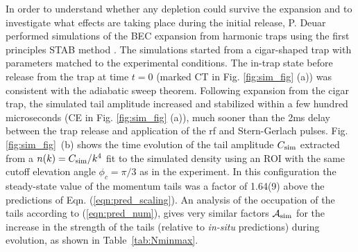 	In order to {understand} whether any depletion could survive the expansion and to investigate what effects are taking place during the initial release, P. Deuar performed simulations of the BEC expansion from harmonic traps using the first principles STAB method \cite{Deuar11,Kheruntsyan12}. 
	The simulations started from a cigar-shaped trap with parameters matched to the experimental conditions. 
	The in-trap state before release from the trap at time $t=0$ (marked CT in Fig. \ref{fig:sim_fig} (a)) was consistent with the adiabatic sweep theorem. 
	Following expansion from the cigar trap, the simulated tail amplitude increased and stabilized within a few hundred microseconds (CE in Fig. \ref{fig:sim_fig} (a)), much sooner than the 2ms delay between the trap release and application of the rf and Stern-Gerlach pulses. 
	Fig. \ref{fig:sim_fig}~(b) shows the time evolution of the tail amplitude {$C_{\rm sim}$ extracted from a $n(k)=C_{\rm sim}/k^4$ fit to the simulated density} %
	using {an ROI with the same cutoff elevation angle $\phi_c=\pi/3$ as in the experiment.}  
	In this configuration the steady-state value of the momentum tails was a factor of 1.64(9) above the predictions of Eqn. (\ref{eqn:pred_scaling}). 
	{An analysis of the occupation of the tails according to (\ref{eqn:pred_num}), gives very similar factors $\mathcal{A}_{\rm sim}$ for the increase in the strength of the tails (relative to \emph{in-situ} predictions) during evolution, as shown in Table~\ref{tab:Nminmax}.}

